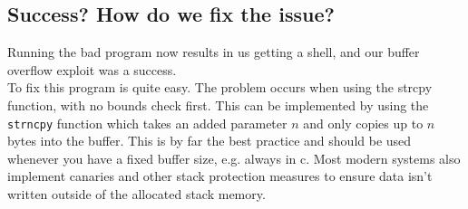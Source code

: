 \documentclass{article}
\begin{document}
\subsection{Success? How do we fix the issue?}
Running the bad program now results in us getting a shell, and our buffer overflow
exploit was a success.\\
To fix this program is quite easy. The problem occurs when using the strcpy function,
with no bounds check first. This can be implemented by using the \verb!strncpy! function
which takes an added parameter $n$ and only copies up to $n$ bytes into the buffer.
This is by far the best practice and should be used whenever you have a fixed
buffer size, e.g. always in c. Most modern systems also implement canaries and other
stack protection measures to ensure data isn't written outside of the allocated 
stack memory.\\
\end{document}
